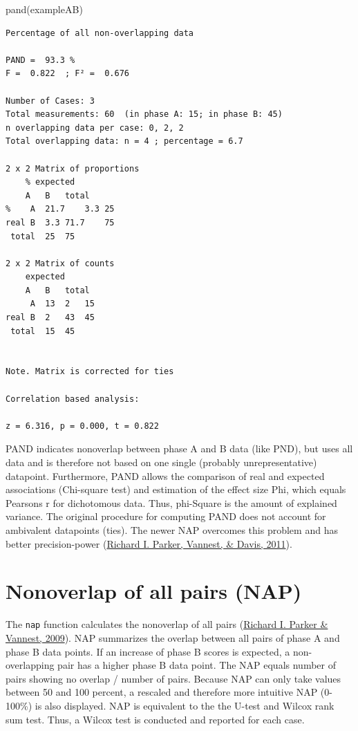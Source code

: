 \documentclass[
]{book}
\newenvironment{Shaded}{\begin{snugshade}}{\end{snugshade}}
\newcommand{\FunctionTok}[1]{\textcolor[rgb]{0.00,0.00,0.00}{#1}}
\newcommand{\NormalTok}[1]{#1}
\begin{document}
\begin{Shaded}
\begin{Highlighting}[]
\FunctionTok{pand}\NormalTok{(exampleAB)}
\end{Highlighting}
\end{Shaded}

\begin{verbatim}
Percentage of all non-overlapping data

PAND =  93.3 %
F =  0.822  ; F² =  0.676 

Number of Cases: 3 
Total measurements: 60  (in phase A: 15; in phase B: 45)
n overlapping data per case: 0, 2, 2
Total overlapping data: n = 4 ; percentage = 6.7 

2 x 2 Matrix of proportions
    % expected
    A   B   total
%    A  21.7    3.3 25
real B  3.3 71.7    75
 total  25  75

2 x 2 Matrix of counts
    expected
    A   B   total
     A  13  2   15
real B  2   43  45
 total  15  45


Note. Matrix is corrected for ties

Correlation based analysis:

z = 6.316, p = 0.000, t = 0.822 
\end{verbatim}

PAND indicates nonoverlap between phase A and B data (like PND), but uses all data and is therefore not based on one single (probably unrepresentative) datapoint. Furthermore, PAND allows the comparison of real and expected associations (Chi-square test) and estimation of the effect size Phi, which equals Pearsons r for dichotomous data. Thus, phi-Square is the amount of explained variance. The original procedure for computing PAND does not account for ambivalent datapoints (ties). The newer NAP overcomes this problem and has better precision-power (\protect\hyperlink{ref-parker_effect_2011}{Richard I. Parker, Vannest, \& Davis, 2011}).

\hypertarget{nonoverlap-of-all-pairs-nap}{%
\section{Nonoverlap of all pairs (NAP)}\label{nonoverlap-of-all-pairs-nap}}

The \texttt{nap} function calculates the nonoverlap of all pairs (\protect\hyperlink{ref-parker_improved_2009}{Richard I. Parker \& Vannest, 2009}). NAP summarizes the overlap between all pairs of phase A and phase B data points. If an increase of phase B scores is expected, a non-overlapping pair has a higher phase B data point. The NAP equals number of pairs showing no overlap / number of pairs. Because NAP can only take values between 50 and 100 percent, a rescaled and therefore more intuitive NAP (0-100\%) is also displayed. NAP is equivalent to the the U-test and Wilcox rank sum test. Thus, a Wilcox test is conducted and reported for each case.
\end{document}
